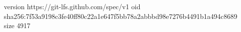 version https://git-lfs.github.com/spec/v1
oid sha256:7f53a9198c3fe40ff80c22a1e647f5bb78a2abbbd98e7276b4491b1a494c8689
size 4917
